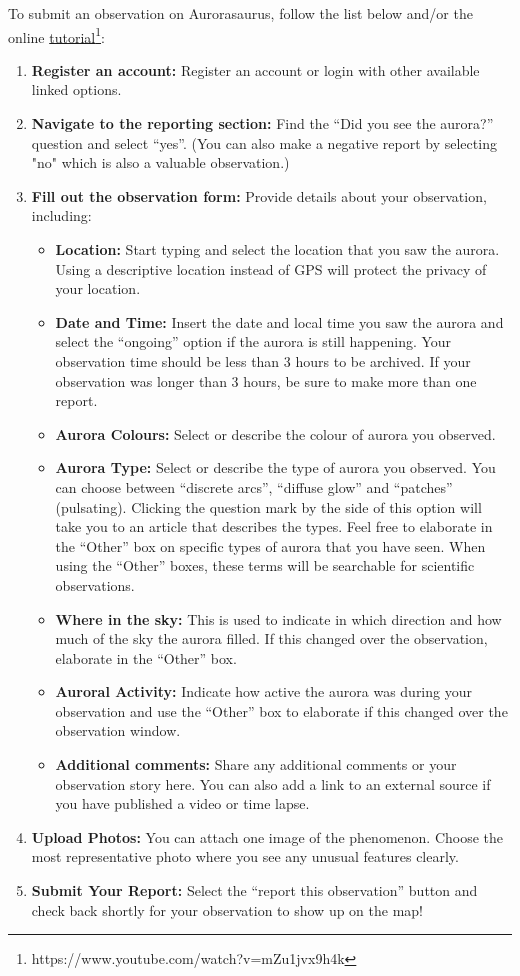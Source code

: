 \documentclass{article}
\begin{document}
To submit an observation on Aurorasaurus, follow the list below and/or the online \href{https://www.youtube.com/watch?v=mZu1jvx9h4k}{tutorial}\footnote{https://www.youtube.com/watch?v=mZu1jvx9h4k}:

\begin{enumerate}
    \item \textbf{Register an account:} Register an account or login with other available linked options.
    \item \textbf{Navigate to the reporting section:} Find the ``Did you see the aurora?'' question and select ``yes''. (You can also make a negative report by selecting "no" which is also a valuable observation.)
    \item \textbf{Fill out the observation form:} Provide details about your observation, including:
        \begin{itemize}
        \item \textbf{Location:} Start typing and select the location that you saw the aurora. Using a descriptive location instead of  GPS will protect the privacy of your location.
        \item \textbf{Date and Time:} Insert the date and local time you saw the aurora and select the ``ongoing'' option if the aurora is still happening. Your observation time should be less than 3 hours to be archived. If your observation was longer than 3 hours, be sure to make more than one report.
        \item \textbf{Aurora Colours:} Select or describe the colour of aurora you observed.
        \item \textbf{Aurora Type:} Select or describe the type of aurora you observed. You can choose between ``discrete arcs'', ``diffuse glow'' and ``patches'' (pulsating). Clicking the question mark by the side of this option will take you to an article that describes the types. Feel free to elaborate in the ``Other'' box on specific types of aurora that you have seen. When using the ``Other'' boxes, these terms will be searchable for scientific observations.
        \item \textbf{Where in the sky:} This is used to indicate in which direction and how much of the sky the aurora filled. If this changed over the observation, elaborate in the ``Other'' box.
        \item \textbf{Auroral Activity:} Indicate how active the aurora was during your observation and use the ``Other'' box to elaborate if this changed over the observation window.
        \item \textbf{Additional comments:} Share any additional comments or your observation story here. You can also add a link to an external source if you have published a video or time lapse.
    \end{itemize}
        \item \textbf{Upload Photos:} 
        You can attach one image of the phenomenon. Choose the most representative photo where you see any unusual features clearly.
        \item \textbf{Submit Your Report:} 
        Select the ``report this observation'' button and check back shortly for  your observation to show up on the map!



\end{enumerate}
\end{document}
